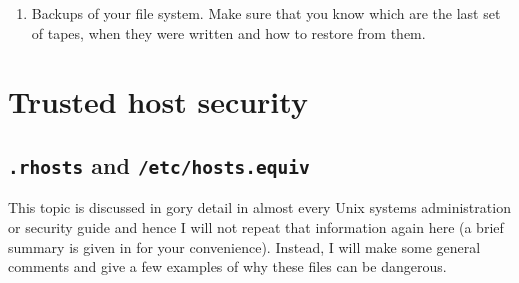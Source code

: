 \begin{enumerate}
\begin{enumerate}
\begin{enumerate}
\item Disk information  
\begin{quote} {\tt /usr/sbin/prtvtoc} {\it raw disk} (Solaris 2.x) \end{quote}

\item showrev information, including patch level 
\begin{quote} {\tt /usr/bin/showrev -a} (Solaris 2.x) \end{quote}

\end{enumerate}

Scripts to gather most of this information for you for both Solaris and
Digital Unix are available via the 

Example output from such a script showing, the sort of information you
may need for system recovery, can be found in 
. Make sure that 
you keep a paper copy of this file!

\item Backups of your file system. Make sure that you know which are the last
set of tapes, when they were written and how to restore from them.

\end{enumerate}

\end{enumerate}


\section{\label{trusted_host_security}Trusted host security}

\subsection {{\tt .rhosts} and {\tt /etc/hosts.equiv}}

This topic is discussed in gory detail in almost every Unix systems
administration or security guide and hence I will not repeat that
information again here (a brief summary is given in 
for your convenience). 
Instead, I will make some general comments and give a few
examples of why these files can be dangerous.

